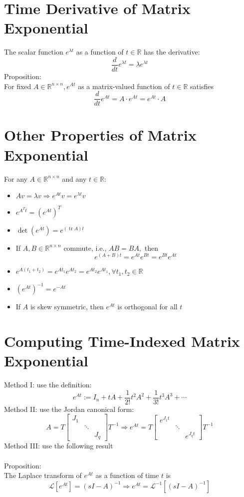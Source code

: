 \documentclass[10pt,a4paper,oneside]{article}
\begin{document}
\section{Time Derivative of Matrix Exponential}
The scalar function $e^{\lambda t}$ as a function of $t \in \mathbb{R}$ has the derivative:
\[
\frac{d}{d t} e^{\lambda t}=\lambda e^{\lambda t}
\]
Proposition:\\
For fixed $A \in \mathbb{R}^{n \times n}, e^{A t}$ as a matrix-valued function of $t \in \mathbb{R}$ satisfies
\[
\frac{d}{d t} e^{A t}=A \cdot e^{A t}=e^{A t} \cdot A
\]
\section{Other Properties of Matrix Exponential}
For any $A \in \mathbb{R}^{n \times n}$ and any $t \in \mathbb{R}$:
\begin{itemize}
\item $A v=\lambda v \Rightarrow e^{A t} v=e^{\lambda t} v$
\item $e^{A^{T} t}=\left(e^{A t}\right)^{T}$
\item $\operatorname{det}\left(e^{A t}\right)=e^{(\operatorname{tr} A) t}$
\item If $A, B \in \mathbb{R}^{n \times n}$ commute, i.e., $A B=B A,$ then
\[
e^{(A+B) t}=e^{A t} e^{B t}=e^{B t} e^{A t}
\]
\item $e^{A\left(t_{1}+t_{2}\right)}=e^{A t_{1}} e^{A t_{2}}=e^{A t_{2}} e^{A t_{1}}, \forall t_{1}, t_{2} \in \mathbb{R}$
\item $\left(e^{A t}\right)^{-1}=e^{-A t}$
\item If $A$ is skew symmetric, then $e^{A t}$ is orthogonal for all $t$
\end{itemize}
\section{Computing Time-Indexed Matrix Exponential}
Method I: use the definition:
\[
e^{A t} :=I_{n}+t A+\frac{1}{2 !} t^{2} A^{2}+\frac{1}{3 !} t^{3} A^{3}+\cdots
\]
Method II: use the Jordan canonical form:
\[
A=T\left[\begin{array}{lll}{J_{1}} & {} & {} \\ {} & {\ddots} & {} \\ {} & {} & {J_{q}}\end{array}\right] T^{-1} \Rightarrow e^{A t}=T\left[\begin{array}{ccc}{e^{J_{1} t}} & {} & {} \\ {} & {\ddots} & {} \\ {} & {} & {e^{J_{q} t}}\end{array}\right] T^{-1}
\]
Method III: use the following result\\
\\
Proposition:\\
The Laplace transform of $e^{At}$ as a function of time $t$ is
\[
\mathcal{L}\left[e^{A t}\right]=(sI-A)^{-1} \Rightarrow e^{A t} = \mathcal{L}^{-1}\left[(sI-A)^{-1}\right]
\]
\end{document}
